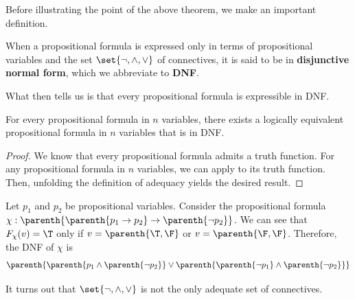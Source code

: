 Before illustrating the point of the above theorem, we make an important definition.

\begin{boxdefinition}
    When a propositional formula is expressed only in terms of propositional variables and the set $\set{\neg, \land, \lor}$ of connectives, it is said to be in \textbf{disjunctive normal form}, which we abbreviate to \textbf{DNF}.
\end{boxdefinition}

What  then tells us is that every propositional formula is expressible in DNF.

\begin{boxcorollary}
    For every propositional formula in $n$ variables, there exists a logically equivalent propositional formula in $n$ variables that is in DNF.
\end{boxcorollary}
\begin{proof}
    We know that every propositional formula admits a truth function. For any propositional formula in $n$ variables, we can apply  to its truth function. Then, unfolding the definition of adequacy yields the desired result.
\end{proof}

\begin{boxexample}
    Let $p_1$ and $p_2$ be propositional variables. Consider the propositional formula $\chi : \parenth{\parenth{p_1 \to p_2} \to \parenth{\neg p_2}}$. We can see that $F_{\chi}(v) = \T$ only if $v = \parenth{\T, \F}$ or $v = \parenth{\F, \F}$. Therefore, the DNF of $\chi$ is
    \begin{align*}
        \parenth{\parenth{p_1 \land \parenth{\neg p_2}} \lor \parenth{\parenth{\neg p_1} \land \parenth{\neg p_2}}}
    \end{align*}
\end{boxexample}

It turns out that $\set{\neg, \land, \lor}$ is not the only adequate set of connectives.

